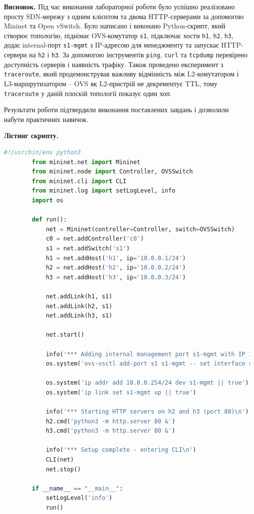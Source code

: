 \documentclass[14pt, a4paper]{extreport}
\begin{document}
	\textbf{Висновок.}
	Під час виконання лабораторної роботи було успішно реалізовано просту SDN-мережу з одним клієнтом та двома HTTP-серверами за допомогою Mininet та Open vSwitch. Було написано і виконано Python-скрипт, який створює топологію, піднімає OVS-комутатор \texttt{s1}, підключає хости \texttt{h1}, \texttt{h2}, \texttt{h3}, додає internal-порт \texttt{s1-mgmt} з IP-адресою для менеджменту та запускає HTTP-сервери на \texttt{h2} і \texttt{h3}. За допомогою інструментів \texttt{ping}, \texttt{curl} та \texttt{tcpdump} перевірено доступність серверів і наявність трафіку. Також проведено експеримент з \texttt{traceroute}, який продемонстрував важливу відмінність між L2-комутатором і L3-маршрутизатором -- OVS як L2-пристрій не декрементує TTL, тому \texttt{traceroute} у даній плоскій топології показує один хоп.
	
	Результати роботи підтвердили виконання поставлених завдань і дозволили набути практичних навичок.
	
	\begin{center}
		\textbf{Лістинг скрипту.}
	\end{center}
	
	\begin{lstlisting}[language=Python]
		#!/usr/bin/env python3
		from mininet.net import Mininet
		from mininet.node import Controller, OVSSwitch
		from mininet.cli import CLI
		from mininet.log import setLogLevel, info
		import os
		
		def run():
			net = Mininet(controller=Controller, switch=OVSSwitch)
			c0 = net.addController('c0')
			s1 = net.addSwitch('s1')
			h1 = net.addHost('h1', ip='10.0.0.1/24')
			h2 = net.addHost('h2', ip='10.0.0.2/24')
			h3 = net.addHost('h3', ip='10.0.0.3/24')
		
			net.addLink(h1, s1)
			net.addLink(h2, s1)
			net.addLink(h3, s1)
		
			net.start()
		
			info('*** Adding internal management port s1-mgmt with IP 10.0.0.254/24\n')
			os.system('ovs-vsctl add-port s1 s1-mgmt -- set interface s1-mgmt type=internal')
		
			os.system('ip addr add 10.0.0.254/24 dev s1-mgmt || true')
			os.system('ip link set s1-mgmt up || true')
		
			info('*** Starting HTTP servers on h2 and h3 (port 80)\n')
			h2.cmd('python3 -m http.server 80 &')
			h3.cmd('python3 -m http.server 80 &')
		
			info('*** Setup complete - entering CLI\n')
			CLI(net)
			net.stop()
		
		if __name__ == "__main__":
			setLogLevel('info')
			run()\end{lstlisting}
		
\end{document}
